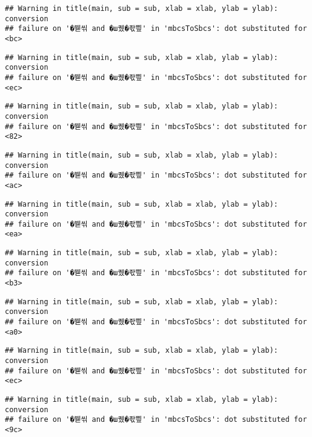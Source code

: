 \documentclass[]{article}
\begin{document}
\begin{verbatim}
## Warning in title(main, sub = sub, xlab = xlab, ylab = ylab): conversion
## failure on '�붿씪 and �ш퀬�좏삎' in 'mbcsToSbcs': dot substituted for <bc>
\end{verbatim}

\begin{verbatim}
## Warning in title(main, sub = sub, xlab = xlab, ylab = ylab): conversion
## failure on '�붿씪 and �ш퀬�좏삎' in 'mbcsToSbcs': dot substituted for <ec>
\end{verbatim}

\begin{verbatim}
## Warning in title(main, sub = sub, xlab = xlab, ylab = ylab): conversion
## failure on '�붿씪 and �ш퀬�좏삎' in 'mbcsToSbcs': dot substituted for <82>
\end{verbatim}

\begin{verbatim}
## Warning in title(main, sub = sub, xlab = xlab, ylab = ylab): conversion
## failure on '�붿씪 and �ш퀬�좏삎' in 'mbcsToSbcs': dot substituted for <ac>
\end{verbatim}

\begin{verbatim}
## Warning in title(main, sub = sub, xlab = xlab, ylab = ylab): conversion
## failure on '�붿씪 and �ш퀬�좏삎' in 'mbcsToSbcs': dot substituted for <ea>
\end{verbatim}

\begin{verbatim}
## Warning in title(main, sub = sub, xlab = xlab, ylab = ylab): conversion
## failure on '�붿씪 and �ш퀬�좏삎' in 'mbcsToSbcs': dot substituted for <b3>
\end{verbatim}

\begin{verbatim}
## Warning in title(main, sub = sub, xlab = xlab, ylab = ylab): conversion
## failure on '�붿씪 and �ш퀬�좏삎' in 'mbcsToSbcs': dot substituted for <a0>
\end{verbatim}

\begin{verbatim}
## Warning in title(main, sub = sub, xlab = xlab, ylab = ylab): conversion
## failure on '�붿씪 and �ш퀬�좏삎' in 'mbcsToSbcs': dot substituted for <ec>
\end{verbatim}

\begin{verbatim}
## Warning in title(main, sub = sub, xlab = xlab, ylab = ylab): conversion
## failure on '�붿씪 and �ш퀬�좏삎' in 'mbcsToSbcs': dot substituted for <9c>
\end{verbatim}
\end{document}
